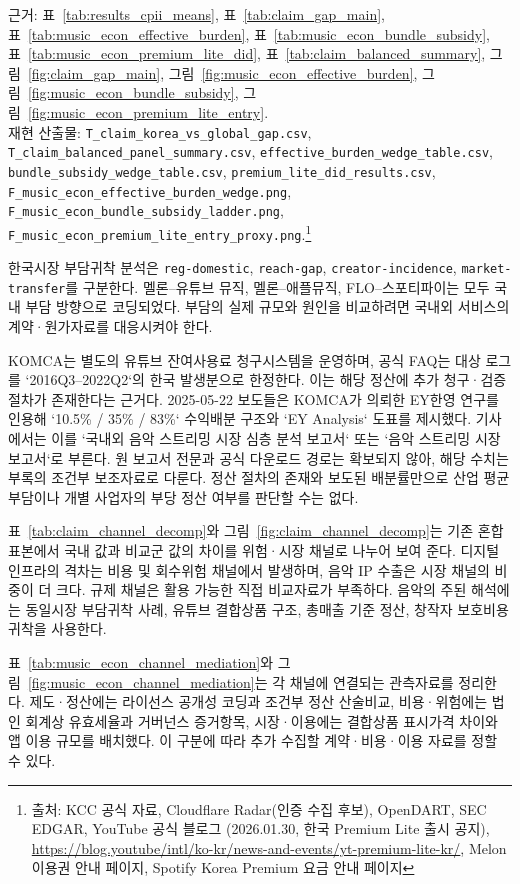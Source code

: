 \documentclass[11pt,a4paper]{report}
\newcommand{\sourcefootnote}[1]{\footnote{출처: #1}}
\newcommand{\srcYouTubeLite}{YouTube 공식 블로그 (2026.01.30, 한국 Premium Lite 출시 공지), \url{https://blog.youtube/intl/ko-kr/news-and-events/yt-premium-lite-kr/}}
\newcommand{\srcSpotifyKR}{Spotify Korea Premium 요금 안내 페이지}
\newcommand{\srcMelonPass}{Melon 이용권 안내 페이지}
\begin{document}
{\par\raggedright\footnotesize 근거: 표~\ref{tab:results_cpii_means}, 표~\ref{tab:claim_gap_main}, 표~\ref{tab:music_econ_effective_burden}, 표~\ref{tab:music_econ_bundle_subsidy}, 표~\ref{tab:music_econ_premium_lite_did}, 표~\ref{tab:claim_balanced_summary}, 그림~\ref{fig:claim_gap_main}, 그림~\ref{fig:music_econ_effective_burden}, 그림~\ref{fig:music_econ_bundle_subsidy}, 그림~\ref{fig:music_econ_premium_lite_entry}.\\
재현 산출물: \nolinkurl{T_claim_korea_vs_global_gap.csv}, \nolinkurl{T_claim_balanced_panel_summary.csv}, \nolinkurl{effective_burden_wedge_table.csv}, \nolinkurl{bundle_subsidy_wedge_table.csv}, \nolinkurl{premium_lite_did_results.csv}, \nolinkurl{F_music_econ_effective_burden_wedge.png}, \nolinkurl{F_music_econ_bundle_subsidy_ladder.png}, \nolinkurl{F_music_econ_premium_lite_entry_proxy.png}.\sourcefootnote{KCC 공식 자료, Cloudflare Radar(인증 수집 후보), OpenDART, SEC EDGAR, \srcYouTubeLite, \srcMelonPass, \srcSpotifyKR}\par}

한국시장 부담귀착 분석은 \texttt{reg-domestic}, \texttt{reach-gap}, \texttt{creator-incidence}, \texttt{market-transfer}를 구분한다. 멜론--유튜브 뮤직, 멜론--애플뮤직, FLO--스포티파이는 모두 국내 부담 방향으로 코딩되었다. 부담의 실제 규모와 원인을 비교하려면 국내외 서비스의 계약·원가자료를 대응시켜야 한다.

KOMCA는 별도의 유튜브 잔여사용료 청구시스템을 운영하며, 공식 FAQ는 대상 로그를 `2016Q3--2022Q2`의 한국 발생분으로 한정한다. 이는 해당 정산에 추가 청구·검증 절차가 존재한다는 근거다. 2025-05-22 보도들은 KOMCA가 의뢰한 EY한영 연구를 인용해 `10.5\% / 35\% / 83\%` 수익배분 구조와 `EY Analysis` 도표를 제시했다. 기사에서는 이를 `국내외 음악 스트리밍 시장 심층 분석 보고서` 또는 `음악 스트리밍 시장 보고서`로 부른다. 원 보고서 전문과 공식 다운로드 경로는 확보되지 않아, 해당 수치는 부록의 조건부 보조자료로 다룬다. 정산 절차의 존재와 보도된 배분률만으로 산업 평균 부담이나 개별 사업자의 부당 정산 여부를 판단할 수는 없다.

표~\ref{tab:claim_channel_decomp}와 그림~\ref{fig:claim_channel_decomp}는 기존 혼합 표본에서 국내 값과 비교군 값의 차이를 위험·시장 채널로 나누어 보여 준다. 디지털 인프라의 격차는 비용 및 회수위험 채널에서 발생하며, 음악 IP 수출은 시장 채널의 비중이 더 크다. 규제 채널은 활용 가능한 직접 비교자료가 부족하다. 음악의 주된 해석에는 동일시장 부담귀착 사례, 유튜브 결합상품 구조, 총매출 기준 정산, 창작자 보호비용 귀착을 사용한다.

표~\ref{tab:music_econ_channel_mediation}와 그림~\ref{fig:music_econ_channel_mediation}는 각 채널에 연결되는 관측자료를 정리한다. 제도·정산에는 라이선스 공개성 코딩과 조건부 정산 산술비교, 비용·위험에는 법인 회계상 유효세율과 거버넌스 증거항목, 시장·이용에는 결합상품 표시가격 차이와 앱 이용 규모를 배치했다. 이 구분에 따라 추가 수집할 계약·비용·이용 자료를 정할 수 있다.
\end{document}
